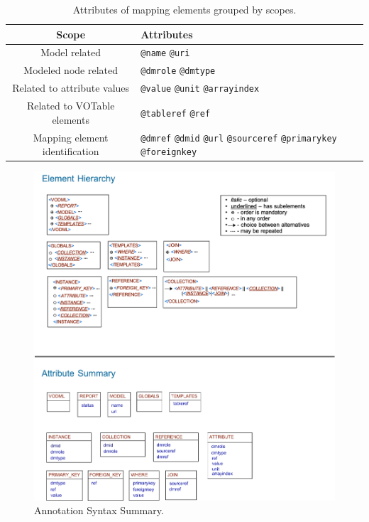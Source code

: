 \begin{table}[!htbp]
\small
\centering
\begin{tabulary}{\linewidth}{|c|J|}       
       \hline 
            \textbf{Scope} & 
            \textbf {Attributes}\\
       \hline         
       \hline  
             Model related & 
             \texttt{@name} \texttt{@uri} \\
       \hline  
             Modeled node related & 
             \texttt{@dmrole} \texttt{@dmtype} \\
       \hline  
             Related to attribute values & 
             \texttt{@value} \texttt{@unit} \texttt{@arrayindex} \\
       \hline  
             Related to VOTable elements & 
             \texttt{@tableref} \texttt{@ref} \\
       \hline  
             Mapping element identification& 
             \texttt{@dmref} \texttt{@dmid} \texttt{@url} \texttt{@sourceref} \texttt{@primarykey} \texttt{@foreignkey} \\
       \hline
     \end{tabulary}
     \caption{Attributes of mapping elements grouped by scopes.} 
     \label{tbl:syntax-att}
 \end{table}
 
 


  \begin{figure}[h]
    \begin{center}
      \includegraphics[width=1.2\textwidth]{mivot-summary.png}
      \caption{Annotation Syntax Summary.}
      \label{fig:summary}
    \end{center}
  \end{figure}
